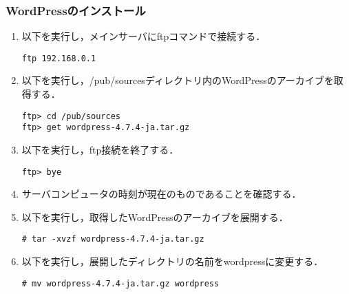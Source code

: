 \documentclass[a4j,titlepage]{jarticle}
\begin{document}
\begin{itemize}
\begin{enumerate}
\subsubsection{WordPressのインストール}
\begin{enumerate}
\item 以下を実行し，メインサーバにftpコマンドで接続する．
\begin{screen}
\begin{center}
\begin{verbatim}
ftp 192.168.0.1
\end{verbatim}
\end{center}
\end{screen}

\item 以下を実行し，/pub/sourcesディレクトリ内のWordPressのアーカイブを取得する．
\begin{screen}
\begin{center}
\begin{verbatim}
ftp> cd /pub/sources
ftp> get wordpress-4.7.4-ja.tar.gz
\end{verbatim}
\end{center}
\end{screen}

\item 以下を実行し，ftp接続を終了する．
\begin{screen}
\begin{center}
\begin{verbatim}
ftp> bye
\end{verbatim}
\end{center}
\end{screen}

\item サーバコンピュータの時刻が現在のものであることを確認する．

\item 以下を実行し，取得したWordPressのアーカイブを展開する．
\begin{screen}
\begin{center}
\begin{verbatim}
# tar -xvzf wordpress-4.7.4-ja.tar.gz
\end{verbatim}
\end{center}
\end{screen}

\item 以下を実行し，展開したディレクトリの名前をwordpressに変更する．
\begin{screen}
\begin{center}
\begin{verbatim}
# mv wordpress-4.7.4-ja.tar.gz wordpress
\end{verbatim}
\end{center}
\end{screen}


\end{enumerate}
\end{enumerate}
\end{itemize}
\end{document}
